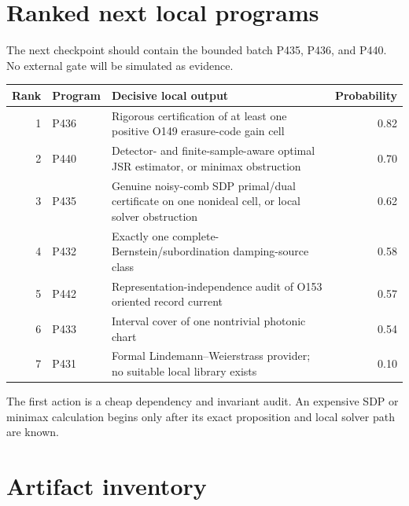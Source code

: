 \documentclass[11pt,a4paper]{article}
\begin{document}
\section{Ranked next local programs}

The next checkpoint should contain the bounded batch P435, P436, and P440.
No external gate will be simulated as evidence.

\begin{longtable}{r p{}p{}r}
\toprule
Rank & Program & Decisive local output & Probability\\\midrule
1 & P436 & Rigorous certification of at least one positive O149 erasure-code gain cell & 0.82\\
2 & P440 & Detector- and finite-sample-aware optimal JSR estimator, or minimax obstruction & 0.70\\
3 & P435 & Genuine noisy-comb SDP primal/dual certificate on one nonideal cell, or local solver obstruction & 0.62\\
4 & P432 & Exactly one complete-Bernstein/subordination damping-source class & 0.58\\
5 & P442 & Representation-independence audit of O153 oriented record current & 0.57\\
6 & P433 & Interval cover of one nontrivial photonic chart & 0.54\\
7 & P431 & Formal Lindemann--Weierstrass provider; no suitable local library exists & 0.10\\
\bottomrule
\end{longtable}

The first action is a cheap dependency and invariant audit. An expensive SDP
or minimax calculation begins only after its exact proposition and local
solver path are known.

\section{Artifact inventory}
\end{document}
